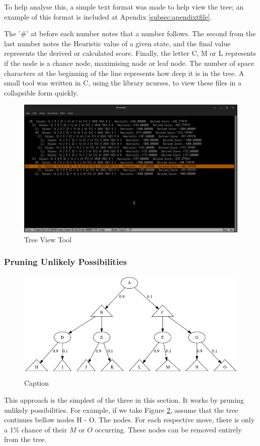 \documentclass{article}
\begin{document}
To help analyse this, a simple text format was made to help view the tree; an example of this format is included at Apendix \ref{subsec:apendixtfile}.

The '\#' at before each number notes that a number follows. The second from the last number notes the Heuristic value of a given state, and the final value represents the derived or calculated score. Finally, the letter C, M or L represents if the node is a chance node, maximising node or leaf node. The number of space characters at the beginning of the line represents how deep it is in the tree. A small tool was written in C, using the library ncurses, to view these files in a collapsible form quickly.
\begin{figure}
    \centering
    \includegraphics[width=1\textwidth]{Screenshot_2023-03-22_03-21-57.png}
    \caption{Tree View Tool}
    \label{fig:my_label}
\end{figure}
\subsubsection{Pruning Unlikely Possibilities}
\begin{figure}
    \centering
    \includegraphics[width=1\textwidth]{unlikleypruning.png}
    \caption{Caption}
    \label{fig:unlikley}
\end{figure}
This approach is the simplest of the three in this section. It works by pruning unlikely possibilities. For example, if we take Figure \ref{fig:unlikley}, assume that the tree continues bellow nodes H - O. The nodes. For each respective move, there is only a 1\% chance of their $M$ or $O$ occurring. These nodes can be removed entirely from the tree.
\end{document}

